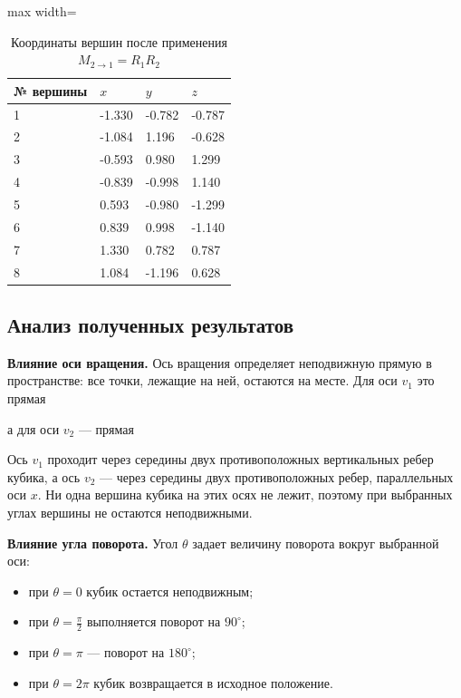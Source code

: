 \documentclass[a4paper,14pt]{extarticle}
\begin{document}
\begin{table}[H]\centering\singlespacing\small
\caption{Координаты вершин после применения $M_{2 \to 1}=R_1R_2$}
\label{tab:p4BA}
\begin{adjustbox}{max width=\linewidth}
\begin{tabular}{llll}
\toprule
№ вершины & $x$ & $y$ & $z$ \\
\midrule
1 & -1.330 & -0.782 & -0.787 \\
2 & -1.084 & 1.196 & -0.628 \\
3 & -0.593 & 0.980 & 1.299 \\
4 & -0.839 & -0.998 & 1.140 \\
5 & 0.593 & -0.980 & -1.299 \\
6 & 0.839 & 0.998 & -1.140 \\
7 & 1.330 & 0.782 & 0.787 \\
8 & 1.084 & -1.196 & 0.628 \\
\bottomrule\end{tabular}\end{adjustbox}\end{table}

\subsection*{Анализ полученных результатов}

\textbf{Влияние оси вращения.} Ось вращения определяет неподвижную прямую в пространстве: все точки, лежащие на ней, остаются на месте. Для оси $v_1$ это прямая

\begin{center}\end{center}

а для оси $v_2$ — прямая

\begin{center}\end{center}

Ось $v_1$ проходит через середины двух противоположных вертикальных ребер кубика, а ось $v_2$ — через середины двух противоположных ребер, параллельных оси $x$. Ни одна вершина кубика на этих осях не лежит, поэтому при выбранных углах вершины не остаются неподвижными.

\textbf{Влияние угла поворота.} Угол $\theta$ задает величину поворота вокруг выбранной оси:

\begin{itemize}
\item при $\theta=0$ кубик остается неподвижным;
\item при $\theta=\frac{\pi}{2}$ выполняется поворот на $90^\circ$;
\item при $\theta=\pi$ — поворот на $180^\circ$;
\item при $\theta=2\pi$ кубик возвращается в исходное положение.
\end{itemize}
\end{document}
